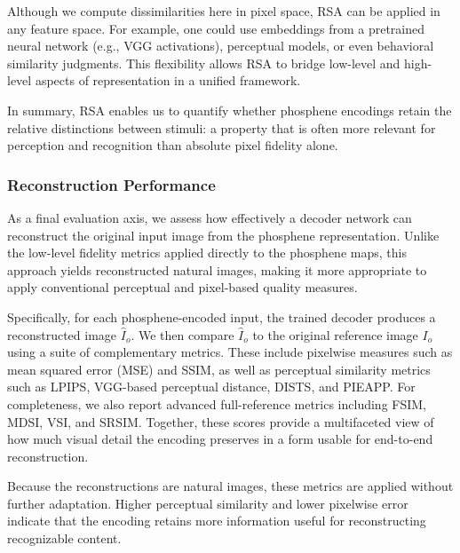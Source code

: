 Although we compute dissimilarities here in pixel space, RSA can be applied in any feature space. For example, one could use embeddings from a pretrained neural network (e.g., VGG activations), perceptual models, or even behavioral similarity judgments. This flexibility allows RSA to bridge low-level and high-level aspects of representation in a unified framework.

In summary, RSA enables us to quantify whether phosphene encodings retain the relative distinctions between stimuli: a property that is often more relevant for perception and recognition than absolute pixel fidelity alone.

\subsubsection{Reconstruction Performance}
As a final evaluation axis, we assess how effectively a decoder network can reconstruct the original input image from the phosphene representation. Unlike the low-level fidelity metrics applied directly to the phosphene maps, this approach yields reconstructed natural images, making it more appropriate to apply conventional perceptual and pixel-based quality measures.

Specifically, for each phosphene-encoded input, the trained decoder produces a reconstructed image \(\hat{I}_o\). We then compare \(\hat{I}_o\) to the original reference image \(I_o\) using a suite of complementary metrics. These include pixelwise measures such as mean squared error (MSE) and SSIM, as well as perceptual similarity metrics such as LPIPS, VGG-based perceptual distance, DISTS, and PIEAPP. For completeness, we also report advanced full-reference metrics including FSIM, MDSI, VSI, and SRSIM. Together, these scores provide a multifaceted view of how much visual detail the encoding preserves in a form usable for end-to-end reconstruction.

Because the reconstructions are natural images, these metrics are applied without further adaptation. Higher perceptual similarity and lower pixelwise error indicate that the encoding retains more information useful for reconstructing recognizable content.
